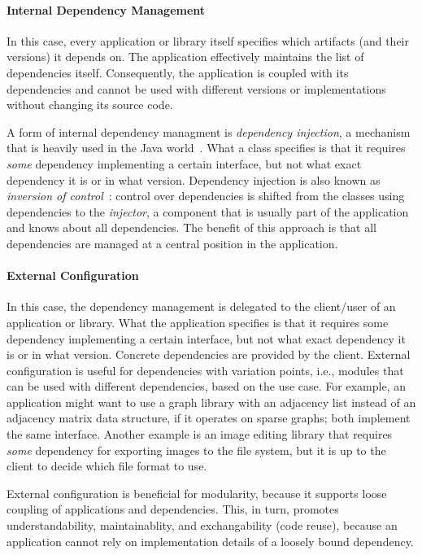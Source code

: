 \paragraph{Internal Dependency Management}
In this case, every application or library itself specifies which artifacts (and their versions) it depends on. The application effectively maintains the list of dependencies itself. Consequently, the application is coupled with its dependencies and cannot be used with different versions or implementations without changing its source code.

A form of internal dependency managment is \emph{dependency injection}, a mechanism that is heavily used in the Java world~\cite{Prasanna:2009:DI:1795686}. What a class specifies is that it requires \emph{some} dependency implementing a certain interface, but not what exact dependency it is or in what version. Dependency injection is also known as \emph{inversion of control}~\cite{fowlerioc}: control over dependencies is shifted from the classes using dependencies to the \emph{injector}, a component that is usually part of the application and knows about all dependencies. The benefit of this approach is that all dependencies are managed at a central position in the application.

\paragraph{External Configuration}
In this case, the dependency management is delegated to the client/user of an application or library. What the application specifies is that it requires some dependency implementing a certain interface, but not what exact dependency it is or in what version. Concrete dependencies are provided by the client. External configuration is useful for dependencies with variation points, i.e., modules that can be used with different dependencies, based on the use case. For example, an application might want to use a graph library with an adjacency list instead of an adjacency matrix data structure, if it operates on sparse graphs; both implement the same interface. Another example is an image editing library that requires \emph{some} dependency for exporting images to the file system, but it is up to the client to decide which file format to use. 

External configuration is beneficial for modularity, because it supports loose coupling of applications and dependencies. This, in turn, promotes understandability, maintainablity, and exchangability (code reuse), because an application cannot rely on implementation details of a loosely bound dependency.

